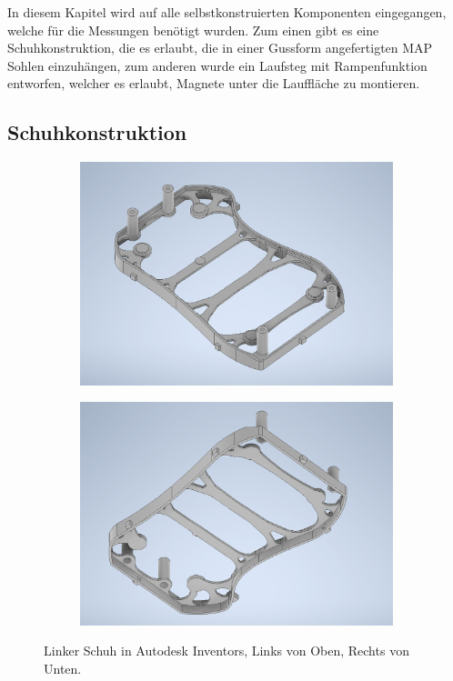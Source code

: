 In diesem Kapitel wird auf alle selbstkonstruierten Komponenten eingegangen, welche für die Messungen benötigt wurden. Zum einen gibt es eine Schuhkonstruktion, die es erlaubt, die in einer Gussform angefertigten MAP Sohlen einzuhängen, zum anderen wurde ein Laufsteg mit Rampenfunktion entworfen, welcher es erlaubt, Magnete unter die Lauffläche zu montieren. 

\subsection{Schuhkonstruktion} \label{Schuhkonstruktion}
\begin{figure}[tb]
	\hfill
	\begin{subfigure}[c]{.49\linewidth}
		\centering
		\includegraphics[width=\linewidth]{Bilder/Schuh_oben.png}
	\end{subfigure}
	\begin{subfigure}[c]{.49\linewidth}
		\centering
		\includegraphics[width=\linewidth]{Bilder/Schuh_unten.png}
	\end{subfigure}
	\hfill
	\caption{Linker Schuh in Autodesk Inventors, Links von Oben, Rechts von Unten.}
	\label{Schuh_Inventor}
\end{figure}
